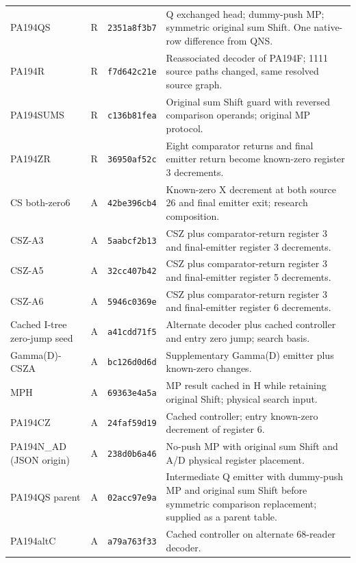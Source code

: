 \begin{longtable}{@{}p{3.3cm}p{1.3cm}p{1.9cm}p{9.1cm}@{}}
PA194QS & R & \texttt{2351a8f3b7} & Q exchanged head; dummy-push MP; symmetric original sum Shift. One native-row difference from QNS.\\[4pt]
PA194R & R & \texttt{f7d642c21e} & Reassociated decoder of PA194F; 1111 source paths changed, same resolved source graph.\\[4pt]
PA194SUMS & R & \texttt{c136b81fea} & Original sum Shift guard with reversed comparison operands; original MP protocol.\\[4pt]
PA194ZR & R & \texttt{36950af52c} & Eight comparator returns and final emitter return become known-zero register 3 decrements.\\[4pt]
CS both-\allowbreak zero6 & A & \texttt{42be396cb4} & Known-zero X decrement at both source 26 and final emitter exit; research composition.\\[4pt]
CSZ-\allowbreak A3 & A & \texttt{5aabcf2b13} & CSZ plus comparator-return register 3 and final-emitter register 3 decrements.\\[4pt]
CSZ-\allowbreak A5 & A & \texttt{32cc407b42} & CSZ plus comparator-return register 3 and final-emitter register 5 decrements.\\[4pt]
CSZ-\allowbreak A6 & A & \texttt{5946c0369e} & CSZ plus comparator-return register 3 and final-emitter register 6 decrements.\\[4pt]
Cached I-\allowbreak tree zero-\allowbreak jump seed & A & \texttt{a41cdd71f5} & Alternate decoder plus cached controller and entry zero jump; search basis.\\[4pt]
Gamma(D)-\allowbreak CSZA & A & \texttt{bc126d0d6d} & Supplementary Gamma(D) emitter plus known-zero changes.\\[4pt]
MPH & A & \texttt{69363e4a5a} & MP result cached in H while retaining original Shift; physical search input.\\[4pt]
PA194CZ & A & \texttt{24faf59d19} & Cached controller; entry known-zero decrement of register 6.\\[4pt]
PA194N\_\allowbreak AD (JSON origin) & A & \texttt{238d0b6a46} & No-push MP with original sum Shift and A/D physical register placement.\\[4pt]
PA194QS parent & A & \texttt{02acc97e9a} & Intermediate Q emitter with dummy-push MP and original sum Shift before symmetric comparison replacement; supplied as a parent table.\\[4pt]
PA194altC & A & \texttt{a79a763f33} & Cached controller on alternate 68-reader decoder.\\[4pt]

\end{longtable}
